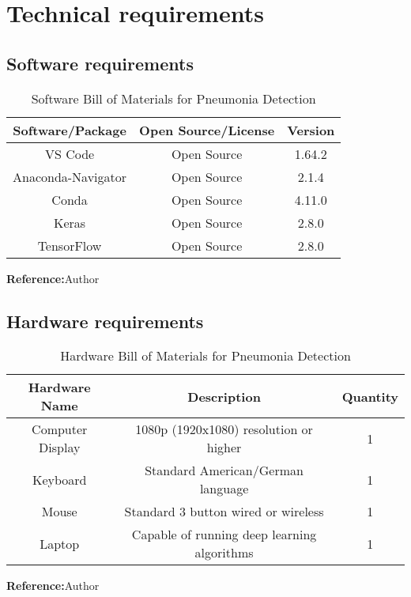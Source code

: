 \chapter{Technical requirements}

\section{Software requirements}

\begin{table}[h]
	\centering
	\caption{Software Bill of Materials for Pneumonia Detection}
	\label{tab:Software Bill of Materials}
	\begin{tabular}{|c|c|c|}
		\hline
		\textbf{Software/Package} & \textbf{Open Source/License} & \textbf{Version}\\
		\hline
		VS Code & Open Source & 1.64.2\\
		\hline
		Anaconda-Navigator & Open Source & 2.1.4\\
		\hline
		Conda & Open Source & 4.11.0\\
		\hline
		Keras & Open Source & 2.8.0\\
		\hline
		TensorFlow & Open Source & 2.8.0\\
		\hline
	\end{tabular}
   \footnotesize \textbf{Reference:}Author
\end{table}

\section{Hardware requirements}

\begin{table}[h]
	\centering
	\caption{Hardware Bill of Materials for Pneumonia Detection}
	\label{tab:Hardware Bill of Materials}
    \begin{tabular}{|c|c|c|}
    \hline
	\textbf{Hardware Name} & \textbf{Description} & \textbf{Quantity}\\
	\hline
	Computer Display & 1080p (1920x1080) resolution or higher & 1\\
	\hline
	Keyboard & Standard American/German language & 1\\
	\hline
	Mouse & Standard 3 button wired or wireless & 1\\
	\hline
	Laptop & Capable of running deep learning algorithms & 1\\
	\hline
\end{tabular}
 \footnotesize \textbf{Reference:}Author
\end{table}
